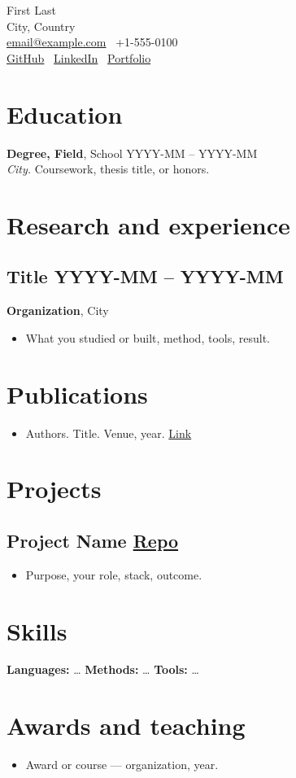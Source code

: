 \documentclass[11pt,letterpaper]{article}
\makeatletter
\newcommand{\Name}{First Last}
\newcommand{\Email}{email@example.com}
\newcommand{\Phone}{+1-555-0100}
\newcommand{\Location}{City, Country}
\newcommand{\LinkedIn}{https://linkedin.com/in/username}
\newcommand{\GitHub}{https://github.com/username}
\newcommand{\Portfolio}{https://example.com}
\makeatother
\begin{document}
\begin{center}
  {\LARGE \Name}\\[0.3em]
  \Location\\
  \href{mailto:\Email}{\Email} \quad \textbar\ \quad \Phone\\
  \href{\GitHub}{GitHub} \quad \textbar\ \quad \href{\LinkedIn}{LinkedIn} \quad \textbar\ \quad \href{\Portfolio}{Portfolio}
\end{center}

\section{Education}
\textbf{Degree, Field}, School \hfill YYYY-MM -- YYYY-MM\\
\textit{City.} Coursework, thesis title, or honors.

\section{Research and experience}
\subsection{Title \hfill YYYY-MM -- YYYY-MM}
\textbf{Organization}, City
\begin{itemize}
  \item What you studied or built, method, tools, result.
\end{itemize}

\section{Publications}
\begin{itemize}
  \item Authors. Title. Venue, year. \href{https://example.com}{Link}
\end{itemize}

\section{Projects}
\subsection{Project Name \hfill \href{https://github.com/org/repo}{Repo}}
\begin{itemize}
  \item Purpose, your role, stack, outcome.
\end{itemize}

\section{Skills}
\textbf{Languages:} \ldots \quad
\textbf{Methods:} \ldots \quad
\textbf{Tools:} \ldots

\section{Awards and teaching}
\begin{itemize}
  \item Award or course --- organization, year.
\end{itemize}
\end{document}
